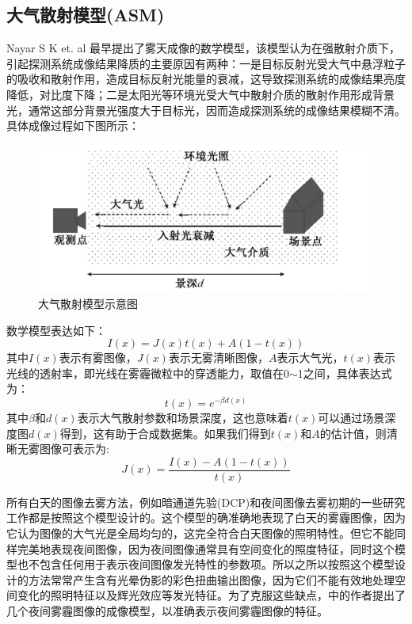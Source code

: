 \begin{multicols}{2}
\subsection{大气散射模型(ASM)}

Nayar S K et. al\cite{1} 最早提出了雾天成像的数学模型，该模型认为在强散射介质下，引起探测系统成像结果降质的主要原因有两种：一是目标反射光受大气中悬浮粒子的吸收和散射作用，造成目标反射光能量的衰减，这导致探测系统的成像结果亮度降低，对比度下降；二是太阳光等环境光受大气中散射介质的散射作用形成背景光，通常这部分背景光强度大于目标光，因而造成探测系统的成像结果模糊不清。具体成像过程如下图所示：
\begin{figure}[H]
	\centering
	\includegraphics[width=0.9\linewidth]{pics/screenshot001}
	\caption{大气散射模型示意图}
	\label{fig:screenshot009}
\end{figure}
数学模型表达如下：
\begin{equation}
	I(x)=J(x)t(x)+A(1-t(x))
\end{equation}
其中$I(x)$表示有雾图像，$J(x)$表示无雾清晰图像，$A$表示大气光，$t(x)$表示光线的透射率，即光线在雾霾微粒中的穿透能力，取值在0$\sim$1之间，具体表达式为：
\begin{equation}
	t(x)=e^{-\beta d(x)}
\end{equation}
其中$\beta$和$d(x)$表示大气散射参数和场景深度，这也意味着$t(x)$可以通过场景深度图$d(x)$得到，这有助于合成数据集。如果我们得到$t(x)$和$A$的估计值，则清晰无雾图像可表示为:
\begin{equation}
	J(x) = \frac{I(x)-A(1-t(x))}{t(x)}
\end{equation}

所有白天的图像去雾方法，例如暗通道先验(DCP)\cite{10}和夜间图像去雾初期的一些研究工作\cite{3}\cite{11}都是按照这个模型设计的。这个模型的确准确地表现了白天的雾霾图像，因为它认为图像的大气光是全局均匀的，这完全符合白天图像的照明特性。但它不能同样完美地表现夜间图像，因为夜间图像通常具有空间变化的照度特征，同时这个模型也不包含任何用于表示夜间图像发光特性的参数项。所以之所以按照这个模型设计的方法常常产生含有光晕伪影的彩色扭曲输出图像，因为它们不能有效地处理空间变化的照明特征以及辉光效应等发光特征。为了克服这些缺点，\cite{2}\cite{3}\cite{12}中的作者提出了几个夜间雾霾图像的成像模型，以准确表示夜间雾霾图像的特征。


\end{multicols}
